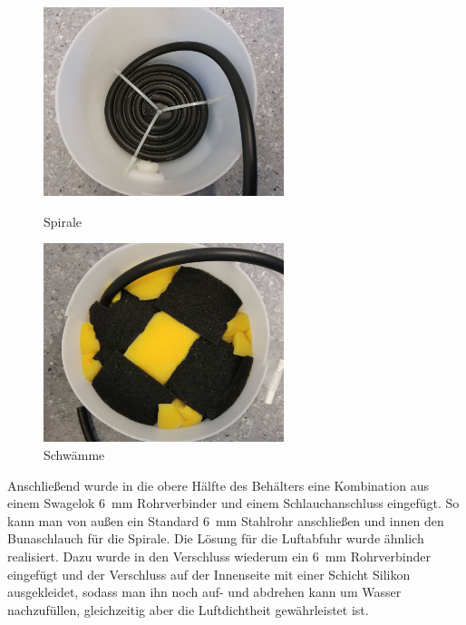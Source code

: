 \begin{figure}[h]
	\begin{minipage}[hbt]{7cm}
		\centering
		\includegraphics[width=7cm]{Luftbefeuchter_Spirale.jpg}
		\caption{Spirale}
	\end{minipage}
	\hfill
	\begin{minipage}[hbt]{7cm}
		\centering
		\includegraphics[width=7cm]{Luftbefeuchter_Schwaemme.jpg}
		\caption{Schwämme}
	\end{minipage}
\end{figure}

Anschließend wurde in die obere Hälfte des Behälters eine Kombination aus einem Swagelok \SI{6}{mm} Rohrverbinder und einem Schlauchanschluss eingefügt. So kann man von außen ein Standard \SI{6}{mm} Stahlrohr anschließen und innen den Bunaschlauch für die Spirale. Die Lösung für die Luftabfuhr wurde ähnlich realisiert. Dazu wurde in den Verschluss wiederum ein \SI{6}{mm} Rohrverbinder eingefügt und der Verschluss auf der Innenseite mit einer Schicht Silikon ausgekleidet, sodass man ihn noch auf- und abdrehen kann um Wasser nachzufüllen, gleichzeitig aber die Luftdichtheit gewährleistet ist.


